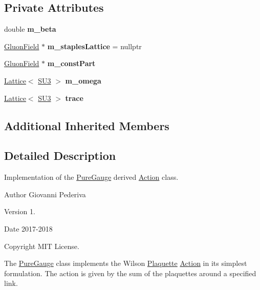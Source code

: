 \subsection*{Private Attributes}
\begin{DoxyCompactItemize}
\item 
double {\bfseries m\+\_\+beta}\hypertarget{classPureGauge_afc5d5fd50c90502b1851f7fa7295e68d}{}\label{classPureGauge_afc5d5fd50c90502b1851f7fa7295e68d}

\item 
\hyperlink{field_8h_afe80b127697eba6d6e7fbd8121c8d4ee}{Gluon\+Field} $\ast$ {\bfseries m\+\_\+staples\+Lattice} = nullptr\hypertarget{classPureGauge_ae2b14c7d0c1e2f5cb070b9d8ed9ab237}{}\label{classPureGauge_ae2b14c7d0c1e2f5cb070b9d8ed9ab237}

\item 
\hyperlink{field_8h_afe80b127697eba6d6e7fbd8121c8d4ee}{Gluon\+Field} $\ast$ {\bfseries m\+\_\+const\+Part}\hypertarget{classPureGauge_ae120c791a7462c26995eebc902a2ae2a}{}\label{classPureGauge_ae120c791a7462c26995eebc902a2ae2a}

\item 
\hyperlink{classLattice}{Lattice}$<$ \hyperlink{structSU3}{S\+U3} $>$ {\bfseries m\+\_\+omega}\hypertarget{classPureGauge_a1a70fe500b7f005c0e82da6b7c5f3509}{}\label{classPureGauge_a1a70fe500b7f005c0e82da6b7c5f3509}

\item 
\hyperlink{classLattice}{Lattice}$<$ \hyperlink{structSU3}{S\+U3} $>$ {\bfseries trace}\hypertarget{classPureGauge_abbe94c552df9ba24ba63377189af9f24}{}\label{classPureGauge_abbe94c552df9ba24ba63377189af9f24}

\end{DoxyCompactItemize}
\subsection*{Additional Inherited Members}


\subsection{Detailed Description}
Implementation of the \hyperlink{classPureGauge}{Pure\+Gauge} derived \hyperlink{classAction}{Action} class. 

\begin{DoxyAuthor}{Author}
Giovanni Pederiva 
\end{DoxyAuthor}
\begin{DoxyVersion}{Version}
1. 
\end{DoxyVersion}
\begin{DoxyDate}{Date}
2017-\/2018 
\end{DoxyDate}
\begin{DoxyCopyright}{Copyright}
M\+IT License.
\end{DoxyCopyright}
The \hyperlink{classPureGauge}{Pure\+Gauge} class implements the Wilson \hyperlink{classPlaquette}{Plaquette} \hyperlink{classAction}{Action} in its simplest formulation. The action is given by the sum of the plaquettes around a specified link. 

